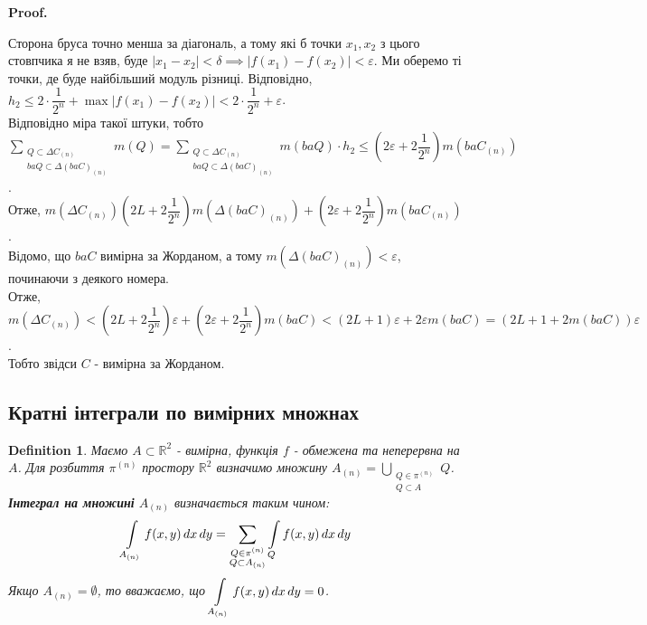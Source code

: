 \documentclass[a4paper, 10pt]{article}
\makeatletter
\def\qed{$\blacksquare$}
\theoremstyle{theoremdd}
\theoremstyle{theoremdd}
\newtheorem{definition}[theorem]{Definition}
\theoremstyle{theoremdd}
\theoremstyle{theoremdd}
\theoremstyle{theoremdd}
\theoremstyle{theoremdd}
\theoremstyle{theoremdd}
\theoremstyle{theoremdd}
\renewenvironment{proof}[1][Proof.\\]{\par
\pushQED{\hfill \qed}%
\normalfont \topsep6\p@\@plus6\p@\relax
\trivlist
\item\relax
{\bfseries
#1\@addpunct{.}}\hspace\labelsep\ignorespaces
}{%
\popQED\endtrivlist\@endpefalse
}
\makeatother
\begin{document}
\begin{proof}
Сторона бруса точно менша за діагональ, а тому які б точки $x_1,x_2$ з цього стовпчика я не взяв, буде $|x_1-x_2| < \delta \implies |f(x_1)-f(x_2)| < \varepsilon$. Ми оберемо ті точки, де буде найбільший модуль різниці. Відповідно, $h_2 \leq 2 \cdot \dfrac{1}{2^n} + \max |f(x_1)-f(x_2)| < 2 \cdot \dfrac{1}{2^n} + \varepsilon$.\\
Відповідно міра такої штуки, тобто $\displaystyle\sum_{\substack{Q \subset \Delta C_{(n)} \\ baQ \subset \Delta (baC)_{(n)} }} m(Q) = \sum_{\substack{Q \subset \Delta C_{(n)} \\ baQ \subset \Delta (baC)_{(n)}}} m(baQ) \cdot h_2 \leq \left( 2 \varepsilon + 2 \dfrac{1}{2^n} \right) m(baC_{(n)})$.\\
Отже, $m(\Delta C_{(n)}) \left( 2L + 2\dfrac{1}{2^n} \right) m(\Delta (baC)_{(n)}) + \left( 2 \varepsilon + 2 \dfrac{1}{2^n} \right) m(baC_{(n)})$.\\
Відомо, що $baC$ вимірна за Жорданом, а тому $m(\Delta (baC)_{(n)}) < \varepsilon$, починаючи з деякого номера.\\
Отже, $m(\Delta C_{(n)}) < \left( 2L + 2\dfrac{1}{2^n} \right) \varepsilon + \left( 2 \varepsilon + 2 \dfrac{1}{2^n} \right) m(baC) < (2L+1)\varepsilon + 2\varepsilon m(baC) = (2L+1+2m(baC))\varepsilon$.\\
Тобто звідси $C$ - вимірна за Жорданом.
\end{proof}

\subsection{Кратні інтеграли по вимірних множнах}
\begin{definition}
Маємо $A \subset \mathbb{R}^2$ - вимірна, функція $f$ - обмежена та неперервна на $A$. Для розбиття $\pi^{(n)}$ простору $\mathbb{R}^2$ визначимо множину $A_{(n)} = \displaystyle\bigcup_{\substack{Q \in \pi^{(n)} \\ Q \subset A}} Q$.\\
\textbf{Інтеграл на множині} $A_{(n)}$ визначається таким чином:
\begin{align*}
\int\displaylimits_{A_{(n)}} f(x,y)\,dx\,dy = \sum_{\substack{Q \in \pi^{(n)} \\ Q \subset A_{{(n)}}}} \int\displaylimits_Q f(x,y)\,dx\,dy
\end{align*}
Якщо $A_{(n)} = \emptyset$, то вважаємо, що $\displaystyle\int\displaylimits_{A_{(n)}} f(x,y)\,dx\,dy = 0$.
\end{definition}
\end{document}
